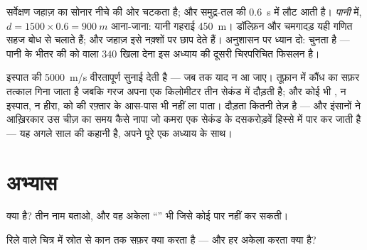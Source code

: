 \begin{example}[सोनार, गंभीरता से]\label{ex:g7:sound-production:sonar}
सर्वेक्षण जहाज़ का सोनार नीचे की ओर चटकता है; और समुद्र-तल की
 \qty{0.6}{s} में लौट आती है। \emph{पानी} में, $d = 1500
\times 0.6 = \qty{900}{m}$ आना-जाना: यानी गहराई \qty{450}{m}। डॉल्फ़िन
और चमगादड़ यही गणित सहज बोध से चलाते हैं; और जहाज़ इसे नक़्शों पर छाप
देते हैं। अनुशासन पर ध्यान दो:   चुनता है --- पानी के भीतर की
 को  वाला $340$ खिला देना इस अध्याय की दूसरी चिरपरिचित
फिसलन है।
\end{example}

\begin{remark}[``तेज़'' अब भी क्या नहीं है]\label{rem:g7:sound-production:light}
इस्पात की \qty{5000}{m/s} वीरतापूर्ण सुनाई देती है --- जब तक 
याद न आ जाए। तूफ़ान में कौंध का सफ़र तत्काल गिना जाता है जबकि गरज
अपना एक किलोमीटर तीन सेकंड में दौड़ती है; और कोई भी , न इस्पात,
न हीरा,  को  की रफ़्तार के आस-पास भी नहीं ला पाता। 
दौड़ता कितनी तेज़ है --- और इंसानों ने आख़िरकार उस चीज़ का समय कैसे
नापा जो कमरा एक सेकंड के दसकरोड़वें हिस्से में पार कर जाती है --- यह
अगले साल की कहानी है, अपने पूरे एक अध्याय के साथ।
\end{remark}

\section{अभ्यास}

\begin{exercise}[$\star$]\label{exo:g7:sound-production:1}
 क्या है? तीन नाम बताओ, और वह अकेला ``'' भी जिसे कोई
 पार नहीं कर सकती।
\end{exercise}

\begin{exercise}[$\star$]\label{exo:g7:sound-production:2}
रिले वाले चित्र में स्रोत से कान तक सफ़र क्या करता है --- और हर अकेला
 करता क्या है?
\end{exercise}

